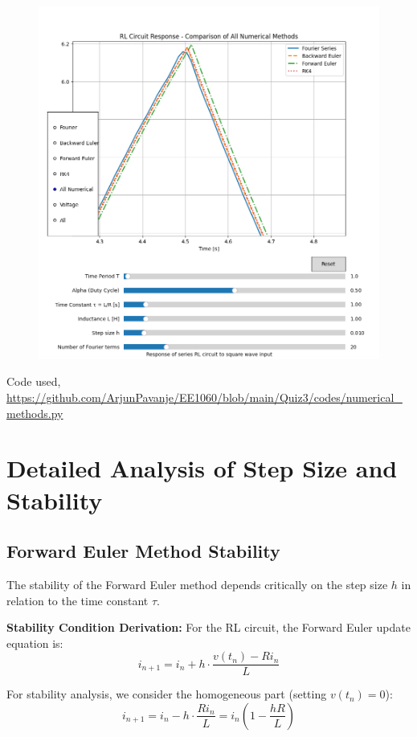 \documentclass[12pt,a4paper]{report}
\begin{document}
\begin{figure}[h!]
\centering
\includegraphics[scale=0.5]{figs/numerical-3.png}
\end{figure}
Code used, \url{https://github.com/ArjunPavanje/EE1060/blob/main/Quiz3/codes/numerical_methods.py}


\chapter{Detailed Analysis of Step Size and Stability}

\section{Forward Euler Method Stability}
The stability of the Forward Euler method depends critically on the step size $h$ in relation to the time constant $\tau$.

\textbf{Stability Condition Derivation:}
For the RL circuit, the Forward Euler update equation is:
\begin{equation}
i_{n+1} = i_n + h \cdot \frac{v(t_n) - Ri_n}{L}
\end{equation}

For stability analysis, we consider the homogeneous part (setting $v(t_n) = 0$):
\begin{equation}
i_{n+1} = i_n - h \cdot \frac{Ri_n}{L} = i_n(1 - \frac{hR}{L})
\end{equation}
\end{document}
